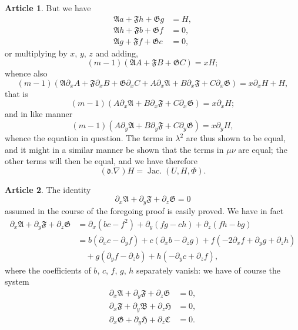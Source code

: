 \documentclass[12pt,a4paper]{article}
\theoremstyle{definition}
\newtheorem{art}{Article}[section]
\DeclareMathOperator{\Jac}{Jac.}
\begin{document}
\begin{art}
But we have
\begin{align*}
\mathfrak{A}a + \mathfrak{F}h + \mathfrak{G}g &= H, \\
\mathfrak{A}h + \mathfrak{F}b + \mathfrak{G}f &= 0, \\
\mathfrak{A}g + \mathfrak{F}f + \mathfrak{G}c &= 0,
\end{align*}
or multiplying by $x$, $y$, $z$ and adding,
\[
(m - 1)(\mathfrak{A}A + \mathfrak{F}B + \mathfrak{G}C) = xH;
\]
whence also
\[
(m - 1)(\mathfrak{A}\partial_x A + \mathfrak{F}\partial_x B + \mathfrak{G}\partial_x C + A\partial_x\mathfrak{A} + B\partial_x\mathfrak{F} + C\partial_x\mathfrak{G}) = x\partial_x H + H,
\]
that is
\[
(m - 1)(A\partial_x\mathfrak{A} + B\partial_x\mathfrak{F} + C\partial_x\mathfrak{G}) = x\partial_x H;
\]
and in like manner
\[
(m - 1)(A\partial_y\mathfrak{A} + B\partial_y\mathfrak{F} + C\partial_y\mathfrak{G}) = x\partial_y H,
\]
whence the equation in question. The terms in $\lambda^2$ are thus shown to be equal, and it might in a similar manner be shown that the terms in $\mu\nu$ are equal; the other terms will then be equal, and we have therefore
\[
(\mathfrak{d}.\nabla)H = \Jac(U, H, \Phi).
\]
\end{art}

\begin{art}
The identity
\[
\partial_x\mathfrak{A} + \partial_y\mathfrak{F} + \partial_z\mathfrak{G} = 0
\]
assumed in the course of the foregoing proof is easily proved. We have in fact
\begin{align*}
\partial_x\mathfrak{A} + \partial_y\mathfrak{F} + \partial_z\mathfrak{G} &= \partial_x(bc - f^2) + \partial_y(fg - ch) + \partial_z(fh - bg) \\
&= b(\partial_x c - \partial_y f) + c(\partial_x b - \partial_z g) + f(-2\partial_x f + \partial_y g + \partial_z h) \\
&\quad + g(\partial_y f - \partial_z b) + h(-\partial_y c + \partial_z f),
\end{align*}
where the coefficients of $b$, $c$, $f$, $g$, $h$ separately vanish: we have of course the system
\begin{align*}
\partial_x\mathfrak{A} + \partial_y\mathfrak{F} + \partial_z\mathfrak{G} &= 0, \\
\partial_x\mathfrak{F} + \partial_y\mathfrak{B} + \partial_z\mathfrak{H} &= 0, \\
\partial_x\mathfrak{G} + \partial_y\mathfrak{H} + \partial_z\mathfrak{C} &= 0.
\end{align*}
\end{art}
\end{document}
